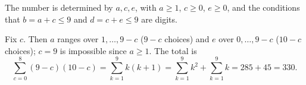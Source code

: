 The number is determined by $a,c,e$, with $a\ge1$, $c\ge0$, $e\ge0$, and the conditions that $b=a+c\le 9$ and $d=c+e\le9$ are digits.

Fix $c$. Then $a$ ranges over $1,\dots,9-c$ ($9-c$ choices) and $e$ over $0,\dots,9-c$ ($10-c$ choices); $c=9$ is impossible since $a\ge1$. The total is
\[\sum_{c=0}^{8}(9-c)(10-c)=\sum_{k=1}^{9}k(k+1)=\sum_{k=1}^{9}k^2+\sum_{k=1}^9k=285+45=\boxed{330}.\]

